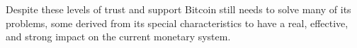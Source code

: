 \documentclass{article}
\begin{document}
Despite these levels of trust and support Bitcoin still needs to solve many of its problems, some derived from its special characteristics to have a real, effective, and strong impact on the current monetary system.

\newpage

\nocite{*}
\printbibliography
\end{document}

